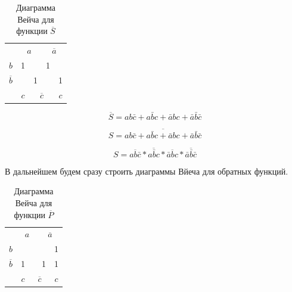 \documentclass[a4paper,14pt]{article}
\begin{document}
\begin{table}[H]
	\begin{center}
		\caption{\label{tab:NSDvSum} Диаграмма Вейча для функции $\overline{S}$}
		\begin{tabular}{ccccc}
			& \multicolumn{2}{c}{$a$}                           & \multicolumn{2}{c}{$\overline{a}$}                          \\ \cline{2-5} 
			\multicolumn{1}{c|}{$b$}  & \multicolumn{1}{c|}{1}  & \multicolumn{1}{c|}{} & \multicolumn{1}{c|}{1}  & \multicolumn{1}{c|}{} \\ \cline{2-5} 
			\multicolumn{1}{c|}{$\overline{b}$} & \multicolumn{1}{c|}{} & \multicolumn{1}{c|}{1}  & \multicolumn{1}{c|}{} & \multicolumn{1}{c|}{1}  \\ \cline{2-5} 
			& $c$                     & \multicolumn{2}{c}{$\overline{c}$}                          & $c$                     
		\end{tabular}
	\end{center}
\end{table}

$$\overline{S} = ab\bar{c} + a\bar{b}c + \bar{a}bc + \bar{a}\bar{b}\bar{c}$$

$$S = \overline{ab\bar{c} + a\bar{b}c + \bar{a}bc + \bar{a}\bar{b}\bar{c}}$$

$$S = \overline{ab\bar{c}} * \overline{a\bar{b}c} * \overline{\bar{a}bc} * \overline{\bar{a}\bar{b}\bar{c}}$$

 В дальнейшем будем сразу строить диаграммы Вйеча для обратных функций.
 
 \begin{table}[H]
 	\begin{center}
 		\caption{\label{tab:NPDvSum} Диаграмма Вейча для функции $\overline{P}$}
 		\begin{tabular}{ccccc}
 			& \multicolumn{2}{c}{$a$}                           & \multicolumn{2}{c}{$\overline{a}$}                          \\ \cline{2-5} 
 			\multicolumn{1}{c|}{$b$}  & \multicolumn{1}{c|}{}  & \multicolumn{1}{c|}{} & \multicolumn{1}{c|}{}  & \multicolumn{1}{c|}{1} \\ \cline{2-5} 
 			\multicolumn{1}{c|}{$\overline{b}$} & \multicolumn{1}{c|}{1} & \multicolumn{1}{c|}{}  & \multicolumn{1}{c|}{1} & \multicolumn{1}{c|}{1}  \\ \cline{2-5} 
 			& $c$                     & \multicolumn{2}{c}{$\overline{c}$}                          & $c$                     
 		\end{tabular}
 	\end{center}
 \end{table}
\end{document}

